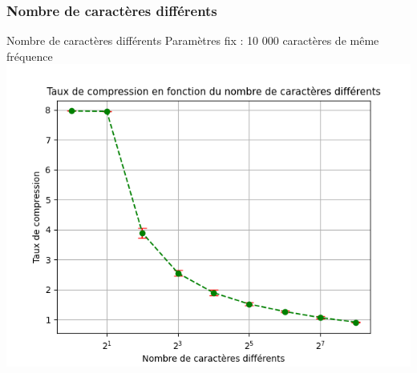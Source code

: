 \documentclass{beamer}
\begin{document}
\subsubsection{Nombre de caractères différents}
\begin{frame}{Nombre de caractères différents}
    Paramètres fix : 10 000 caractères de même fréquence
    \includegraphics[scale=0.66]{car_diff.png}
\end{frame}
\end{document}
